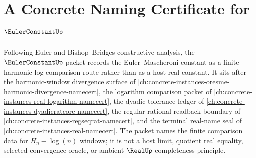\chapter{A Concrete Naming Certificate for $\EulerConstantUp$}
\label{ch:concrete-instances-euler-constant-namecert}

Following Euler and Bishop--Bridges constructive analysis, the $\EulerConstantUp$ packet records the Euler--Mascheroni constant as a finite harmonic-log comparison route rather than as a host real constant. It sits after the harmonic-window divergence surface of \autoref{ch:concrete-instances-oresme-harmonic-divergence-namecert}, the logarithm comparison packet of \autoref{ch:concrete-instances-real-logarithm-namecert}, the dyadic tolerance ledger of \autoref{ch:concrete-instances-dyadicratcore-namecert}, the regular rational readback boundary of \autoref{ch:concrete-instances-regseqrat-namecert}, and the terminal real-name seal of \autoref{ch:concrete-instances-real-namecert}. The packet names the finite comparison data for $H_n-\log(n)$ windows; it is not a host limit, quotient real equality, selected convergence oracle, or ambient $\RealUp$ completeness principle.

